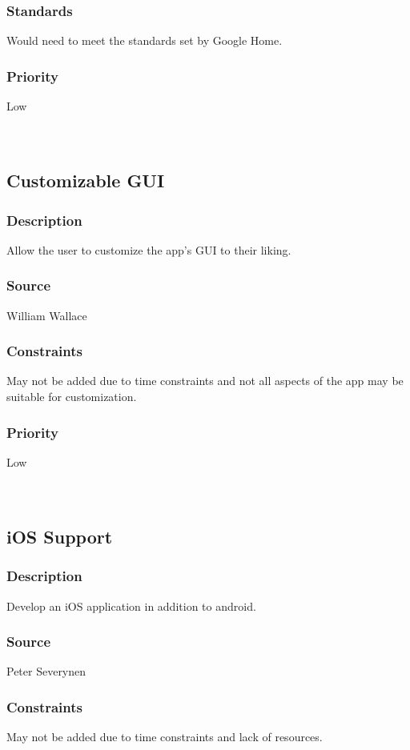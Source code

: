 \subsubsection{Standards}
Would need to meet the standards set by Google Home. 
\subsubsection{Priority}
Low\\
\\
\\
\subsection{Customizable GUI}
\subsubsection{Description}
Allow the user to customize the app's GUI to their liking.
\subsubsection{Source}
William Wallace
\subsubsection{Constraints}
May not be added due to time constraints and not all aspects of the app may be suitable for customization.
\subsubsection{Priority}
Low\\
\\
\\
\subsection{iOS Support}
\subsubsection{Description}
Develop an iOS application in addition to android.
\subsubsection{Source}
Peter Severynen
\subsubsection{Constraints}
May not be added due to time constraints and lack of resources.
